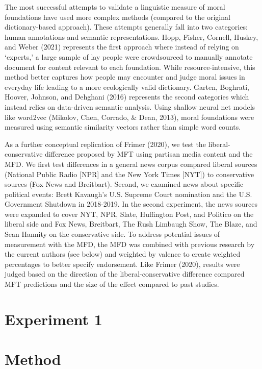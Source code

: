 \documentclass[
  english,
  man]{apa6}
\begin{document}
The most successful attempts to validate a linguistic measure of moral foundations have used more complex methods (compared to the original dictionary-based approach). These attempts generally fall into two categories: human annotations and semantic representations. Hopp, Fisher, Cornell, Huskey, and Weber (2021) represents the first approach where instead of relying on `experts,' a large sample of lay people were crowdsourced to manually annotate document for content relevant to each foundation. While resource-intensive, this method better captures how people may encounter and judge moral issues in everyday life leading to a more ecologically valid dictionary. Garten, Boghrati, Hoover, Johnson, and Dehghani (2016) represents the second categories which instead relies on data-driven semantic analysis. Using shallow neural net models like word2vec (Mikolov, Chen, Corrado, \& Dean, 2013), moral foundations were measured using semantic similarity vectors rather than simple word counts.

As a further conceptual replication of Frimer (2020), we test the liberal-conservative difference proposed by MFT using partisan media content and the MFD. We first test differences in a general news corpus compared liberal sources (National Public Radio {[}NPR{]} and the New York Times {[}NYT{]}) to conservative sources (Fox News and Breitbart). Second, we examined news about specific political events: Brett Kavaugh's U.S. Supreme Court nomination and the U.S. Government Shutdown in 2018-2019. In the second experiment, the news sources were expanded to cover NYT, NPR, Slate, Huffington Post, and Politico on the liberal side and Fox News, Breitbart, The Rush Limbaugh Show, The Blaze, and Sean Hannity on the conservative side. To address potential issues of measurement with the MFD, the MFD was combined with previous research by the current authors (see below) and weighted by valence to create weighted percentages to better specify endorsement. Like Frimer (2020), results were judged based on the direction of the liberal-conservative difference compared MFT predictions and the size of the effect compared to past studies.

\hypertarget{experiment-1}{%
\section{Experiment 1}\label{experiment-1}}

\hypertarget{method}{%
\section{Method}\label{method}}
\end{document}
